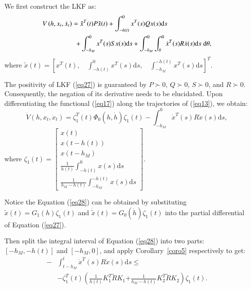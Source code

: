 \documentclass[journal]{IEEEtran}
\begin{document}
\begin{IEEEproof}
  We first construct the LKF as:
  \begin{equation}
    \label{eq27}
    \begin{gathered}
      V\left( {h,{x_t},{{\dot x}_t}} \right) = {{\tilde x}^T}(t)P\tilde x(t) + \int_{ - h(t)}^0 {{x^T}} (s)Qx(s){\text{d}}s \hfill \\
      \quad \quad \quad \quad \quad  + \int_{ - {h_M}}^0 {{x^T}} (s)Sx(s){\text{d}}s + \int_{ - {h_M}}^0 {\int_\theta ^0 {{{\dot x}^T}(s)R\dot x(s){\text{d}}s\;{\text{d}}\theta } },  \hfill \\
    \end{gathered}
  \end{equation}
  where $ \tilde x(t) = {\left[ {{x^T}(t),\quad \int_{ - h(t)}^0 {{x^T}} (s){\text{d}}s,\quad \int_{ - {h_M}}^{ - h(t)} {{x^T}} (s){\text{d}}s} \right]^T} $.

  The positivity of LKF (\ref{eq27}) is guaranteed by $ P \succ 0 $, $ Q \succ 0 $, $ S \succ 0 $, and $ R \succ 0 $. Consequently, the negation of its derivative needs to be elucidated. Upon differentiating the functional (\ref{eq17}) along the trajectories of (\ref{eq13}), we obtain:
  \begin{equation}
    \label{eq28}
    \dot V\left( {h,{x_t},{{\dot x}_t}} \right) = \zeta _1^T(t){\Phi _0}(h,\dot h){\zeta _1}(t) - \int_{ - {h_M}}^0 {{{\dot x}^T}} (s)R\dot x(s){\text{d}}s,
  \end{equation}
  where $ {\zeta _1}(t) = \left[ {\begin{array}{*{20}{c}}
            {x(t)}                                              \\
            {x(t - h(t))}                                       \\
            {x\left( {t - {h_M}} \right)}                       \\
            {\frac{1}{{h(t)}}\int_{ - h(t)}^0 x (s){\text{d}}s} \\
            {\frac{1}{{{h_M} - h(t)}}\int_{ - {h_M}}^{ - h(t)} x (s){\text{d}}s}
          \end{array}} \right] $.

  Notice the Equation (\ref{eq28}) can be obtained by substituting $ \tilde x(t) = {G_1}(h){\zeta _1}(t) $ and $ \dot {\tilde x}(t) = {G_0}(\dot h){\zeta _1}(t) $ into the partial differential of Equation (\ref{eq27}).

  Then split the integral interval of Equation (\ref{eq28}) into two parts: $ [ - {h_M}, - h(t)] $ and $ [ - {h_M},0] $, and apply Corollary~\ref{coro5} respectively to get:
  \begin{equation}
    \begin{aligned}
    \label{eq29}
    - &\int_{t - {h_M}}^t {{{\dot x}^T}} (s)R\dot x(s){\text{d}}s \leqslant  \\
     &- \zeta _1^T(t)\left( {\frac{1}{{h(t)}}K_1^T\tilde R{K_1}} \right.\left. { + \frac{1}{{{h_M} - h(t)}}K_2^T\tilde R{K_2}} \right){\zeta _1}(t).
    \end{aligned}
  \end{equation}


\end{IEEEproof}
\end{document}
